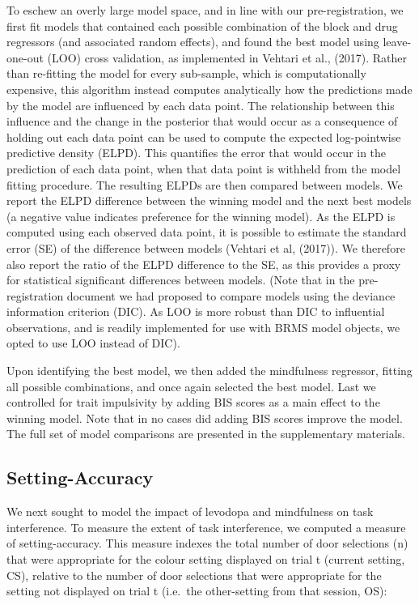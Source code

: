 \documentclass[
  man]{apa6}
\begin{document}
To eschew an overly large model space, and in line with our pre-registration, we first fit models that contained each possible combination of the block and drug regressors (and associated random effects), and found the best model using leave-one-out (LOO) cross validation, as implemented in Vehtari et al., (2017). Rather than re-fitting the model for every sub-sample, which is computationally expensive, this algorithm instead computes analytically how the predictions made by the model are influenced by each data point. The relationship between this influence and the change in the posterior that would occur as a consequence of holding out each data point can be used to compute the expected log-pointwise predictive density (ELPD). This quantifies the error that would occur in the prediction of each data point, when that data point is withheld from the model fitting procedure. The resulting ELPDs are then compared between models. We report the ELPD difference between the winning model and the next best models (a negative value indicates preference for the winning model). As the ELPD is computed using each observed data point, it is possible to estimate the standard error (SE) of the difference between models (Vehtari et al, (2017)). We therefore also report the ratio of the ELPD difference to the SE, as this provides a proxy for statistical significant differences between models. (Note that in the pre-registration document we had proposed to compare models using the deviance information criterion (DIC). As LOO is more robust than DIC to influential observations, and is readily implemented for use with BRMS model objects, we opted to use LOO instead of DIC).

Upon identifying the best model, we then added the mindfulness regressor, fitting all possible combinations, and once again selected the best model. Last we controlled for trait impulsivity by adding BIS scores as a main effect to the winning model. Note that in no cases did adding BIS scores improve the model. The full set of model comparisons are presented in the supplementary materials.

\hypertarget{setting-accuracy}{%
\subsection{Setting-Accuracy}\label{setting-accuracy}}

\label{sec:Setting-Accuracy}

We next sought to model the impact of levodopa and mindfulness on task interference. To measure the extent of task interference, we computed a measure of setting-accuracy. This measure indexes the total number of door selections (n) that were appropriate for the colour setting displayed on trial t (current setting, CS), relative to the number of door selections that were appropriate for the setting not displayed on trial t (i.e.~the other-setting from that session, OS):
\end{document}
